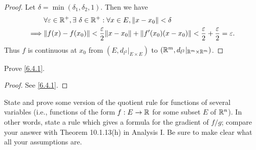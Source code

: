 \begin{proof}
  Let \(\delta = \min(\delta_1, \delta_2, 1)\).
  Then we have
  \begin{align*}
             & \forall \varepsilon \in \R^+, \exists\ \delta \in \R^+ : \forall x \in E, \norm*{x - x_0} < \delta                                                      \\
    \implies & \norm*{f(x) - f(x_0)} < \frac{\varepsilon}{2} \norm*{x - x_0} + \norm*{f'(x_0)(x - x_0)} < \frac{\varepsilon}{2} + \frac{\varepsilon}{2} = \varepsilon.
  \end{align*}
  Thus \(f\) is continuous at \(x_0\) from \((E, d_{l^2}|_{E \times E})\) to \((\mathbb{R}^m, d_{l^2}|_{\mathbb{R}^m \times \mathbb{R}^m})\).
\end{proof}

\begin{ex}\label{ex:6.4.3}
  Prove \cref{6.4.1}.
\end{ex}

\begin{proof}
  See \cref{6.4.1}.
\end{proof}

\begin{ex}\label{ex:6.4.4}
  State and prove some version of the quotient rule for functions of several variables (i.e., functions of the form \(f : E \to \mathbb{R}\) for some subset \(E\) of \(\mathbb{R}^n\)).
  In other words, state a rule which gives a formula for the gradient of \(f / g\);
  compare your answer with Theorem 10.1.13(h) in Analysis I.
  Be sure to make clear what all your assumptions are.
\end{ex}

